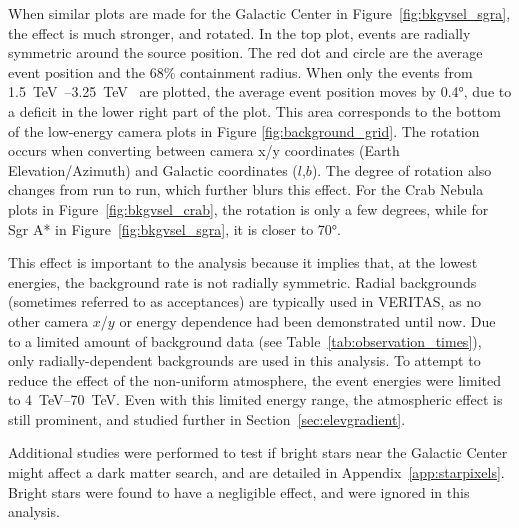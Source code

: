 When similar plots are made for the Galactic Center in Figure~\ref{fig:bkgvsel_sgra}, the effect is much stronger, and rotated.
In the top plot, events are radially symmetric around the source position.
The red dot and circle are the average event position and the 68\% containment radius.
When only the events from \SIrange{1.5}{3.25}{\TeV{}} are plotted, the average event position moves by \ang{0.4}, due to a deficit in the lower right part of the plot.
This area corresponds to the bottom of the low-energy camera plots in Figure \ref{fig:background_grid}.
The rotation occurs when converting between camera x/y coordinates (Earth Elevation/Azimuth) and Galactic coordinates ($l$,$b$).
The degree of rotation also changes from run to run, which further blurs this effect.
For the Crab Nebula plots in Figure~\ref{fig:bkgvsel_crab}, the rotation is only a few degrees, while for Sgr A* in Figure~\ref{fig:bkgvsel_sgra}, it is closer to \ang{70}.
    
This effect is important to the analysis because it implies that, at the lowest energies, the background rate is not radially symmetric.
Radial backgrounds (sometimes referred to as acceptances) are typically used in VERITAS, as no other camera $x$/$y$ or energy dependence had been demonstrated until now.
Due to a limited amount of background data (see Table~\ref{tab:observation_times}), only radially-dependent backgrounds are used in this analysis.
To attempt to reduce the effect of the non-uniform atmosphere, the event energies were limited to \SIrange{4}{70}{TeV}.
Even with this limited energy range, the atmospheric effect is still prominent, and studied further in Section~\ref{sec:elevgradient}.

Additional studies were performed to test if bright stars near the Galactic Center might affect a dark matter search, and are detailed in Appendix~\ref{app:starpixels}.
Bright stars were found to have a negligible effect, and were ignored in this analysis.

\FloatBarrier

